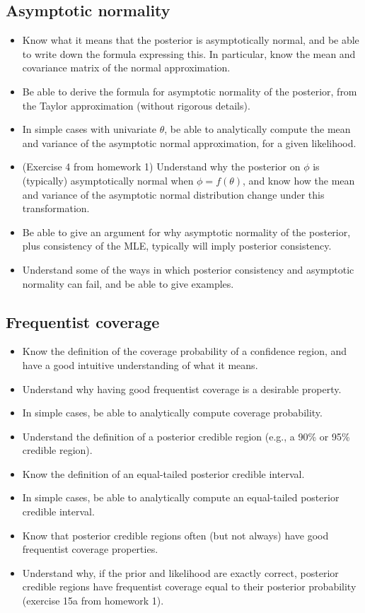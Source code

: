 \documentclass[12pt]{article}
\begin{document}
\subsection{Asymptotic normality}
\begin{itemize}
\item Know what it means that the posterior is asymptotically normal, and be able to write down the formula expressing this. In particular, know the mean and covariance matrix of the normal approximation.
\item Be able to derive the formula for asymptotic normality of the posterior, from the Taylor approximation (without rigorous details).
\item In simple cases with univariate $\theta$, be able to analytically compute the mean and variance of the asymptotic normal approximation, for a given likelihood.
\item (Exercise 4 from homework 1) Understand why the posterior on $\phi$ is (typically) asymptotically normal when $\phi = f(\theta)$, and know how the mean and variance of the asymptotic normal distribution change under this transformation.
\item Be able to give an argument for why asymptotic normality of the posterior, plus consistency of the MLE, typically will imply posterior consistency.
\item Understand some of the ways in which posterior consistency and asymptotic normality can fail, and be able to give examples.
\end{itemize}

\subsection{Frequentist coverage}
\begin{itemize}
\item Know the definition of the coverage probability of a confidence region, and have a good intuitive understanding of what it means.
\item Understand why having good frequentist coverage is a desirable property.
\item In simple cases, be able to analytically compute coverage probability.
\item Understand the definition of a posterior credible region (e.g., a  90\% or 95\% credible region).
\item Know the definition of an equal-tailed posterior credible interval.
\item In simple cases, be able to analytically compute an equal-tailed posterior credible interval.
\item Know that posterior credible regions often (but not always) have good frequentist coverage properties.
\item Understand why, if the prior and likelihood are exactly correct, posterior credible regions have frequentist coverage equal to their posterior probability (exercise 15a from homework 1).
\end{itemize}
\end{document}
